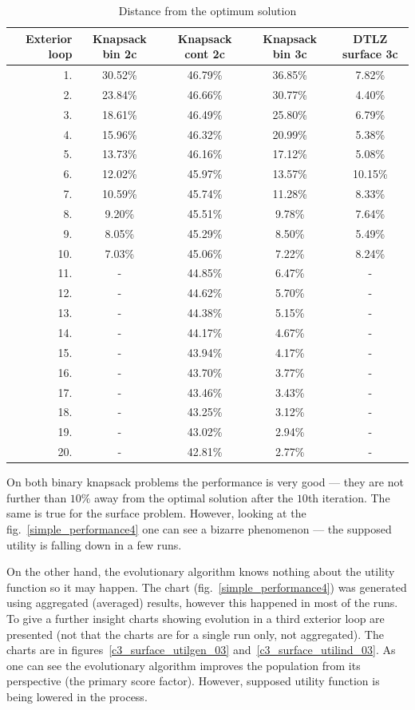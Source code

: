 \begin{table}
  \centering
  \begin{tabular}{r c c c c}
    \hline
    Exterior loop & Knapsack bin 2c & Knapsack cont 2c & Knapsack bin 3c &
    DTLZ surface 3c \\
    \hline
    \hline
    1. & 30.52\% & 46.79\% & 36.85\% & 7.82\% \\
    2. & 23.84\% & 46.66\% & 30.77\% & 4.40\% \\
    3. & 18.61\% & 46.49\% & 25.80\% & 6.79\% \\
    4. & 15.96\% & 46.32\% & 20.99\% & 5.38\% \\
    5. & 13.73\% & 46.16\% & 17.12\% & 5.08\% \\
    6. & 12.02\% & 45.97\% & 13.57\% & 10.15\% \\
    7. & 10.59\% & 45.74\% & 11.28\% & 8.33\% \\
    8. & 9.20\% & 45.51\% & 9.78\% & 7.64\% \\
    9. & 8.05\% & 45.29\% & 8.50\% & 5.49\% \\
    10. & 7.03\% & 45.06\% & 7.22\% & 8.24\% \\
    11. & - & 44.85\% & 6.47\% & - \\
    12. & - & 44.62\% & 5.70\% & - \\
    13. & - & 44.38\% & 5.15\% & - \\
    14. & - & 44.17\% & 4.67\% & - \\
    15. & - & 43.94\% & 4.17\% & - \\
    16. & - & 43.70\% & 3.77\% & - \\
    17. & - & 43.46\% & 3.43\% & - \\
    18. & - & 43.25\% & 3.12\% & - \\
    19. & - & 43.02\% & 2.94\% & - \\
    20. & - & 42.81\% & 2.77\% & - \\
    \hline
  \end{tabular}
  \caption{Distance from the optimum solution}
  \label{t:opt_dist}
\end{table}

On both binary knapsack problems the performance is very good --- they are not
further than $10\%$ away from the optimal solution after the $10$th
iteration. The same is true for the surface problem. However, looking at the
fig.~\ref{simple_performance4} one can see a bizarre phenomenon --- the
supposed utility is falling down in a few runs.

On the other hand, the evolutionary algorithm knows nothing about the utility
function so it may happen. The chart (fig.~\ref{simple_performance4}) was
generated using aggregated (averaged) results, however this happened in most
of the runs. To give a further insight charts showing evolution in a third
exterior loop are presented (not that the charts are for a single run only,
not aggregated). The charts are in figures~\ref{c3_surface_utilgen_03}
and~\ref{c3_surface_utilind_03}. As one can see the evolutionary algorithm
improves the population from its perspective (the primary score factor).
However, supposed utility function is being lowered in the process.


